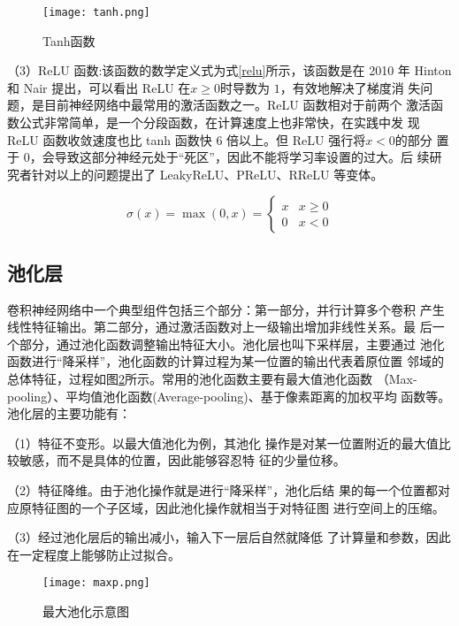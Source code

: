 \begin{figure}[htbp]
    \centering
    \texttt{[image: tanh.png]}
    \caption{Tanh函数}
    \label{tanh}
\end{figure}

（3）ReLU 函数:该函数的数学定义式为式\ref{relu}所示，该函数是在 2010 年
Hinton 和 Nair 提出，可以看出 ReLU 在$x\ge 0$时导数为 $1$，有效地解决了梯度消
失问题，是目前神经网络中最常用的激活函数之一\cite{xu2015empirical}。ReLU 函数相对于前两个
激活函数公式非常简单，是一个分段函数，在计算速度上也非常快，在实践中发
现 ReLU 函数收敛速度也比 tanh 函数快 6 倍以上。但 ReLU 强行将$ x<0$的部分
置于 0，会导致这部分神经元处于“死区”，因此不能将学习率设置的过大。后
续研究者针对以上的问题提出了 LeakyReLU\cite{maas2013rectifier}、PReLU、RReLU 等变体。

\begin{equation}
    \sigma(x)=\max (0, x)= \begin{cases}x & x \geq 0 \\ 0 & x<0\end{cases}
    \label{relu}
\end{equation}

\subsection{池化层}
卷积神经网络中一个典型组件包括三个部分：第一部分，并行计算多个卷积
产生线性特征输出。第二部分，通过激活函数对上一级输出增加非线性关系。最
后一个部分，通过池化函数调整输出特征大小。池化层也叫下采样层，主要通过
池化函数进行“降采样”，池化函数的计算过程为某一位置的输出代表着原位置
邻域的总体特征，过程如图\ref{maxp}所示。常用的池化函数主要有最大值池化函数
（Max-pooling）、平均值池化函数(Average-pooling)、基于像素距离的加权平均
函数等。池化层的主要功能有：

（1）特征不变形。以最大值池化为例，其池化
操作是对某一位置附近的最大值比较敏感，而不是具体的位置，因此能够容忍特
征的少量位移。

（2）特征降维。由于池化操作就是进行“降采样”，池化后结
果的每一个位置都对应原特征图的一个子区域，因此池化操作就相当于对特征图
进行空间上的压缩。

（3）经过池化层后的输出减小，输入下一层后自然就降低
了计算量和参数，因此在一定程度上能够防止过拟合\cite{gu2018recent}。

\begin{figure}[htbp]
    \centering
    \texttt{[image: maxp.png]}
    \caption{最大池化示意图}
    \label{maxp}
\end{figure}

